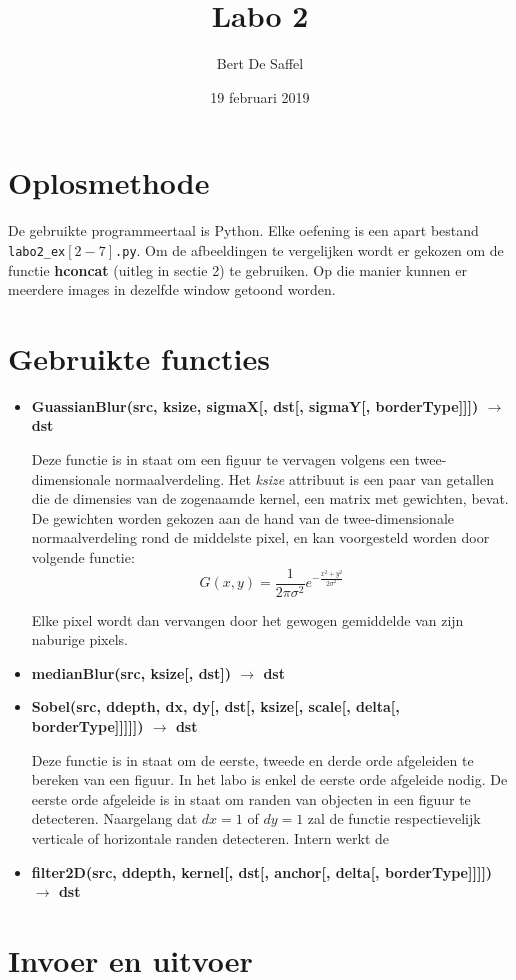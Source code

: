 \documentclass{article}
\begin{document}
	\title{Labo 2}
	\author{Bert De Saffel}
	\date{19 februari 2019}
	\maketitle
	
	\section{Oplosmethode}
	De gebruikte programmeertaal is Python. Elke oefening is een apart bestand \texttt{labo2\_ex$[2-7]$.py}. Om de afbeeldingen te vergelijken wordt er gekozen om de functie \textbf{hconcat} (uitleg in sectie 2) te gebruiken. Op die manier kunnen er meerdere images in dezelfde window getoond worden.
	
	\section{Gebruikte functies}
	\begin{itemize}
		 \item \textbf{GuassianBlur(src, ksize, sigmaX[, dst[, sigmaY[, borderType]]]) $\rightarrow$ dst}
		 
		 Deze functie is in staat om een figuur te vervagen volgens een twee-dimensionale normaalverdeling. Het \textit{ksize} attribuut is een paar van getallen die de dimensies van de zogenaamde kernel, een matrix met gewichten, bevat. De gewichten worden gekozen aan de hand van de twee-dimensionale normaalverdeling rond de middelste pixel, en kan voorgesteld worden door volgende functie:
		 $$G(x, y) = \frac{1}{2\pi\sigma^2}e^{-\frac{x^2 + y^2}{2\sigma^2}}$$
		 
		 Elke pixel wordt dan vervangen door het gewogen gemiddelde van zijn naburige pixels. 
		
		 \item \textbf{medianBlur(src, ksize[, dst]) $\rightarrow$ dst}
		 
		 \item \textbf{Sobel(src, ddepth, dx, dy[, dst[, ksize[, scale[, delta[, borderType]]]]]) $\rightarrow$ dst}
		 
		 Deze functie is in staat om de eerste, tweede en derde orde afgeleiden te bereken van een figuur. In het labo is enkel de eerste orde afgeleide nodig. De eerste orde afgeleide is in staat om randen van objecten in een figuur te detecteren. Naargelang dat $dx = 1$ of $dy = 1$ zal de functie respectievelijk verticale of horizontale randen detecteren. Intern werkt de 
		 
		 \item \textbf{filter2D(src, ddepth, kernel[, dst[, anchor[, delta[, borderType]]]]) $\rightarrow$ dst}
		
		
		
		
	\end{itemize}

	\section{Invoer en uitvoer}
	
\end{document}
